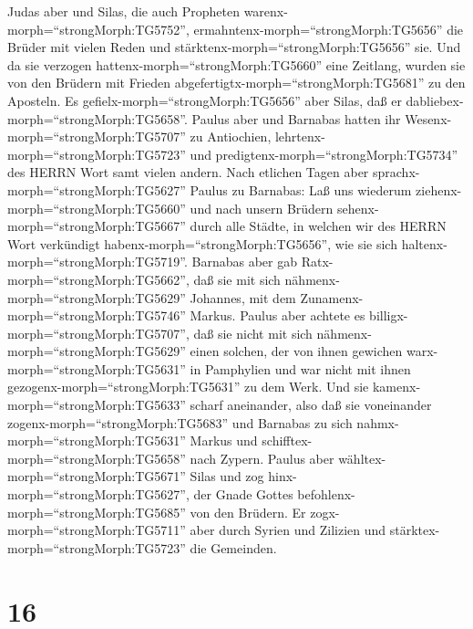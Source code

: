 Judas aber und Silas, die auch Propheten
warenx-morph=``strongMorph:TG5752'',
ermahntenx-morph=``strongMorph:TG5656'' die Brüder mit vielen Reden und
stärktenx-morph=``strongMorph:TG5656'' sie.  Und da sie
verzogen hattenx-morph=``strongMorph:TG5660'' eine Zeitlang, wurden sie
von den Brüdern mit Frieden abgefertigtx-morph=``strongMorph:TG5681'' zu
den Aposteln.  Es gefielx-morph=``strongMorph:TG5656'' aber
Silas, daß er dabliebex-morph=``strongMorph:TG5658''. 
Paulus aber und Barnabas hatten ihr Wesenx-morph=``strongMorph:TG5707''
zu Antiochien, lehrtenx-morph=``strongMorph:TG5723'' und
predigtenx-morph=``strongMorph:TG5734'' des HERRN Wort samt vielen
andern.  Nach etlichen Tagen aber
sprachx-morph=``strongMorph:TG5627'' Paulus zu Barnabas: Laß uns
wiederum ziehenx-morph=``strongMorph:TG5660'' und nach unsern Brüdern
sehenx-morph=``strongMorph:TG5667'' durch alle Städte, in welchen wir
des HERRN Wort verkündigt habenx-morph=``strongMorph:TG5656'', wie sie
sich haltenx-morph=``strongMorph:TG5719''.  Barnabas aber
gab Ratx-morph=``strongMorph:TG5662'', daß sie mit sich
nähmenx-morph=``strongMorph:TG5629'' Johannes, mit dem
Zunamenx-morph=``strongMorph:TG5746'' Markus.  Paulus aber
achtete es billigx-morph=``strongMorph:TG5707'', daß sie nicht mit sich
nähmenx-morph=``strongMorph:TG5629'' einen solchen, der von ihnen
gewichen warx-morph=``strongMorph:TG5631'' in Pamphylien und war nicht
mit ihnen gezogenx-morph=``strongMorph:TG5631'' zu dem Werk.
 Und sie kamenx-morph=``strongMorph:TG5633'' scharf
aneinander, also daß sie voneinander zogenx-morph=``strongMorph:TG5683''
und Barnabas zu sich nahmx-morph=``strongMorph:TG5631'' Markus und
schifftex-morph=``strongMorph:TG5658'' nach Zypern.  Paulus
aber wähltex-morph=``strongMorph:TG5671'' Silas und zog
hinx-morph=``strongMorph:TG5627'', der Gnade Gottes
befohlenx-morph=``strongMorph:TG5685'' von den Brüdern.  Er
zogx-morph=``strongMorph:TG5711'' aber durch Syrien und Zilizien und
stärktex-morph=``strongMorph:TG5723'' die Gemeinden.

\hypertarget{section-15}{%
\section{16}\label{section-15}}

